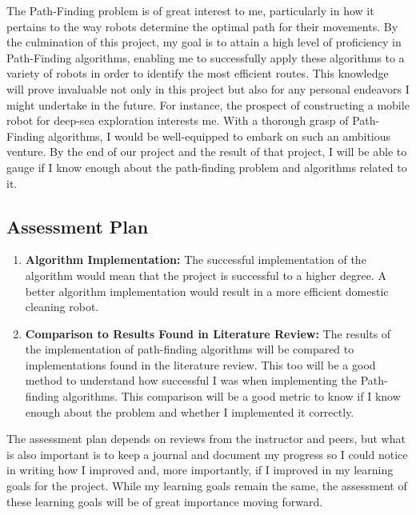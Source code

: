 \documentclass[12pt]{article}
\begin{document}
The Path-Finding problem is of great interest to me, particularly in how it pertains to the way robots determine the optimal path for their movements. By the culmination of this project, my goal is to attain a high level of proficiency in Path-Finding algorithms, enabling me to successfully apply these algorithms to a variety of robots in order to identify the most efficient routes. This knowledge will prove invaluable not only in this project but also for any personal endeavors I might undertake in the future. For instance, the prospect of constructing a mobile robot for deep-sea exploration interests me. With a thorough grasp of Path-Finding algorithms, I would be well-equipped to embark on such an ambitious venture. By the end of our project and the result of that project, I will be able to gauge if I know enough about the path-finding problem and algorithms related to it. 

\subsection{Assessment Plan}

\begin{enumerate}
    \item \textbf{Algorithm Implementation:} The successful implementation of the algorithm would mean that the project is successful to a higher degree. A better algorithm implementation would result in a more efficient domestic cleaning robot.
    
    \item \textbf{Comparison to Results Found in Literature Review:} The results of the implementation of path-finding algorithms will be compared to implementations found in the literature review. This too will be a good method to understand how successful I was when implementing the Path-finding algorithms. This comparison will be a good metric to know if I know enough about the problem and whether I implemented it correctly. 
\end{enumerate}

The assessment plan depends on reviews from the instructor and peers, but what is also important is to keep a journal and document my progress so I could notice in writing how I improved and, more importantly, if I improved in my learning goals for the project. While my learning goals remain the same, the assessment of these learning goals will be of great importance moving forward. 
\end{document}
